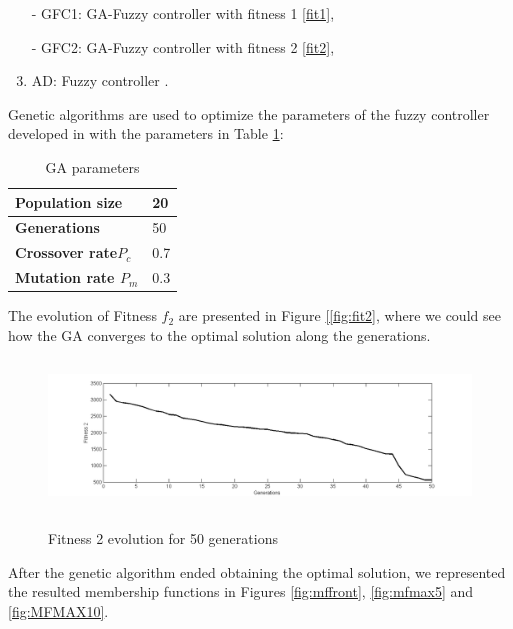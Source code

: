 \documentclass[runningheads,a4paper]{llncs}
\begin{document}
\begin{enumerate}
\item [- GFC1:] GA-Fuzzy controller with fitness 1 \ref{fit1},
	\item[- GFC2:] GA-Fuzzy controller with fitness 2 \ref{fit2},
	\item AD: Fuzzy controller \cite{evo17} .
\end{enumerate}	
%
Genetic algorithms are used to optimize the parameters of the fuzzy controller developed in \cite{evo17} with the parameters in Table \ref{tab:parametre}:
	

	\begin{table}[!ht]	
		\centering
		\caption{GA parameters}
		\label{tab:parametre}
		\begin{tabular}{|p{3.6cm}|p{3cm}|}
			\hline \textbf{Population size} & 20 \\
			\hline \textbf{Generations} & 50   \\
			\hline \textbf{Crossover rate$\textit{P}_{\textit{c}}$} &  0.7 \\
			\hline \textbf{Mutation rate $\textit{P}_{\textit{m}}$} &  0.3   \\ 		
			\hline          
		\end{tabular}	
	\end{table}
The evolution of Fitness $f_2$ are presented in Figure  \ref{[fig:fit2}, where we could see how the GA converges to the optimal solution along the generations.
\begin{figure}[!h]	
	\begin{center}
		\label{[fig:fit2evo}
		\includegraphics[width=15cm,height=4cm]{fig/fit2}
		\caption{Fitness 2 evolution for 50 generations}	
	\end{center}	
\end{figure}
After the genetic algorithm ended obtaining the optimal solution, we represented the resulted membership functions in Figures \ref{fig:mffront}, \ref{fig:mfmax5} and \ref{fig:MFMAX10}.
\end{document}
